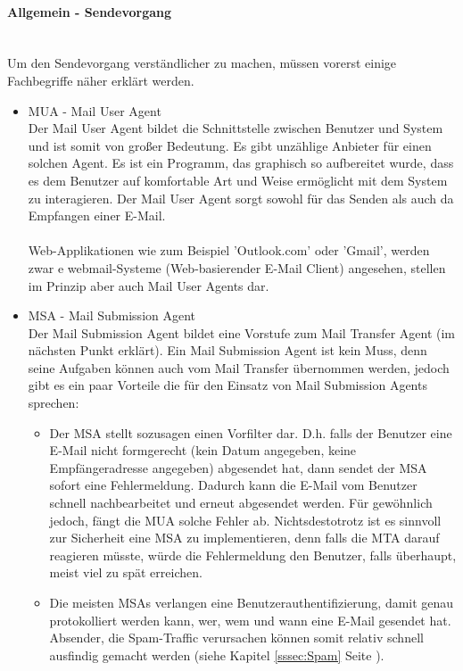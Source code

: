 \documentclass[12pt,a4paper]{report}
\begin{document}
\begin{onehalfspace}
\paragraph{Allgemein - Sendevorgang\\\\}
Um den Sendevorgang verständlicher zu machen, müssen vorerst einige Fachbegriffe näher erklärt werden.
\begin{itemize}
\item MUA - Mail User Agent\\\label{itm:MUA}
Der Mail User Agent bildet die Schnittstelle zwischen Benutzer und System und ist somit von großer Bedeutung. Es gibt unzählige Anbieter für einen solchen Agent. Es ist ein Programm, das graphisch so aufbereitet wurde, dass es dem Benutzer auf komfortable Art und Weise ermöglicht mit dem System zu interagieren. Der Mail User Agent sorgt sowohl für das Senden als auch da Empfangen einer E-Mail.\\\\
Web-Applikationen wie zum Beispiel 'Outlook.com' oder 'Gmail', werden zwar e webmail-Systeme (Web-basierender E-Mail Client) angesehen, stellen im Prinzip aber auch Mail User Agents dar.
\item MSA - Mail Submission Agent\\\label{itm:MSA}
Der Mail Submission Agent bildet eine Vorstufe zum Mail Transfer Agent (im nächsten Punkt erklärt). Ein Mail Submission Agent ist kein Muss, denn seine Aufgaben können auch vom Mail Transfer übernommen werden, jedoch gibt es ein paar Vorteile die für den Einsatz von Mail Submission Agents sprechen:
\begin{itemize}
\item Der MSA stellt sozusagen einen Vorfilter dar. D.h. falls der Benutzer eine E-Mail nicht formgerecht (kein Datum angegeben, keine Empfängeradresse angegeben) abgesendet hat, dann sendet der MSA sofort eine Fehlermeldung. Dadurch kann die E-Mail vom Benutzer schnell nachbearbeitet und erneut abgesendet werden. Für gewöhnlich jedoch, fängt die MUA solche Fehler ab. Nichtsdestotrotz ist es sinnvoll zur Sicherheit eine MSA zu implementieren, denn falls die MTA darauf reagieren müsste, würde die Fehlermeldung den Benutzer, falls überhaupt, meist viel zu spät erreichen.
\item Die meisten MSAs verlangen eine Benutzerauthentifizierung, damit genau protokolliert werden kann, wer, wem und wann eine E-Mail gesendet hat. Absender, die Spam-Traffic verursachen können somit relativ schnell ausfindig gemacht werden (siehe Kapitel \ref{sssec:Spam} Seite \pageref{sssec:Spam}). 

\end{itemize}
\end{itemize}
\end{onehalfspace}
\end{document}

